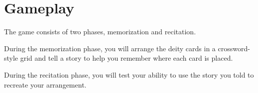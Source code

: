 \section*{Gameplay}

The game consists of two phases, memorization and recitation.

During the memorization phase, you will arrange the deity cards in a crossword-style grid and tell a story to help you remember where each card is placed.

During the recitation phase, you will test your ability to use the story you told to recreate your arrangement.